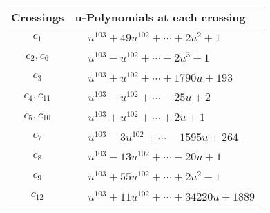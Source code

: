 \documentclass[1p]{elsarticle_modified}
\theoremstyle{definition}
\begin{document}
\begin{tabular}{m{50pt}|m{274pt}}
Crossings & \hspace{64pt}u-Polynomials at each crossing \\
\hline $$\begin{aligned}c_{1}\end{aligned}$$&$\begin{aligned}
&u^{103}+49 u^{102}+\cdots+2 u^2+1
\end{aligned}$\\
\hline $$\begin{aligned}c_{2},c_{6}\end{aligned}$$&$\begin{aligned}
&u^{103}- u^{102}+\cdots-2 u^3+1
\end{aligned}$\\
\hline $$\begin{aligned}c_{3}\end{aligned}$$&$\begin{aligned}
&u^{103}+u^{102}+\cdots+1790 u+193
\end{aligned}$\\
\hline $$\begin{aligned}c_{4},c_{11}\end{aligned}$$&$\begin{aligned}
&u^{103}- u^{102}+\cdots-25 u+2
\end{aligned}$\\
\hline $$\begin{aligned}c_{5},c_{10}\end{aligned}$$&$\begin{aligned}
&u^{103}+u^{102}+\cdots+2 u+1
\end{aligned}$\\
\hline $$\begin{aligned}c_{7}\end{aligned}$$&$\begin{aligned}
&u^{103}-3 u^{102}+\cdots-1595 u+264
\end{aligned}$\\
\hline $$\begin{aligned}c_{8}\end{aligned}$$&$\begin{aligned}
&u^{103}-13 u^{102}+\cdots-20 u+1
\end{aligned}$\\
\hline $$\begin{aligned}c_{9}\end{aligned}$$&$\begin{aligned}
&u^{103}+55 u^{102}+\cdots+2 u^2-1
\end{aligned}$\\
\hline $$\begin{aligned}c_{12}\end{aligned}$$&$\begin{aligned}
&u^{103}+11 u^{102}+\cdots+34220 u+1889
\end{aligned}$\\
\hline
\end{tabular}\newpage\renewcommand{\arraystretch}{1}
\end{document}
